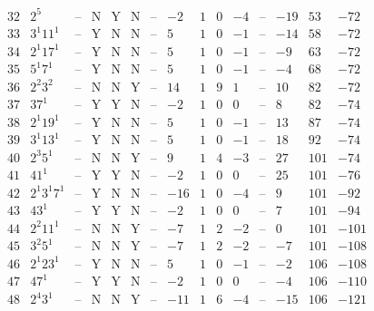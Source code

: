 \documentclass[11pt,reqno,a4letter]{article}
\numberwithin{figure}{section}
\numberwithin{table}{section}
\theoremstyle{plain}
\numberwithin{theorem}{section}
\theoremstyle{definition}
\begin{document}
\begin{table}[h!]
\begin{equation*}
{\begin{array}{|cc|c|ccc|c|c|ccc|c|ccc}
 32 & 2^5 & \text{--} & \text{N} & \text{Y} & \text{N} & \text{--} & -2 & 1 & 0 & -4 & \text{--} & -19 & 53 & -72 \\
 33 & 3^1 11^1 & \text{--} & \text{Y} & \text{N} & \text{N} & \text{--} & 5 & 1 & 0 & -1 & \text{--} & -14 & 58 & -72 \\
 34 & 2^1 17^1 & \text{--} & \text{Y} & \text{N} & \text{N} & \text{--} & 5 & 1 & 0 & -1 & \text{--} & -9 & 63 & -72 \\
 35 & 5^1 7^1 & \text{--} & \text{Y} & \text{N} & \text{N} & \text{--} & 5 & 1 & 0 & -1 & \text{--} & -4 & 68 & -72 \\
 36 & 2^2 3^2 & \text{--} & \text{N} & \text{N} & \text{Y} & \text{--} & 14 & 1 & 9 & 1 & \text{--} & 10 & 82 & -72 \\
 37 & 37^1 & \text{--} & \text{Y} & \text{Y} & \text{N} & \text{--} & -2 & 1 & 0 & 0 & \text{--} & 8 & 82 & -74 \\
 38 & 2^1 19^1 & \text{--} & \text{Y} & \text{N} & \text{N} & \text{--} & 5 & 1 & 0 & -1 & \text{--} & 13 & 87 & -74 \\
 39 & 3^1 13^1 & \text{--} & \text{Y} & \text{N} & \text{N} & \text{--} & 5 & 1 & 0 & -1 & \text{--} & 18 & 92 & -74 \\
 40 & 2^3 5^1 & \text{--} & \text{N} & \text{N} & \text{Y} & \text{--} & 9 & 1 & 4 & -3 & \text{--} & 27 & 101 & -74 \\
 41 & 41^1 & \text{--} & \text{Y} & \text{Y} & \text{N} & \text{--} & -2 & 1 & 0 & 0 & \text{--} & 25 & 101 & -76 \\
 42 & 2^1 3^1 7^1 & \text{--} & \text{Y} & \text{N} & \text{N} & \text{--} & -16 & 1 & 0 & -4 & \text{--} & 9 & 101 & -92 \\
 43 & 43^1 & \text{--} & \text{Y} & \text{Y} & \text{N} & \text{--} & -2 & 1 & 0 & 0 & \text{--} & 7 & 101 & -94 \\
 44 & 2^2 11^1 & \text{--} & \text{N} & \text{N} & \text{Y} & \text{--} & -7 & 1 & 2 & -2 & \text{--} & 0 & 101 & -101 \\
 45 & 3^2 5^1 & \text{--} & \text{N} & \text{N} & \text{Y} & \text{--} & -7 & 1 & 2 & -2 & \text{--} & -7 & 101 & -108 \\
 46 & 2^1 23^1 & \text{--} & \text{Y} & \text{N} & \text{N} & \text{--} & 5 & 1 & 0 & -1 & \text{--} & -2 & 106 & -108 \\
 47 & 47^1 & \text{--} & \text{Y} & \text{Y} & \text{N} & \text{--} & -2 & 1 & 0 & 0 & \text{--} & -4 & 106 & -110 \\
 48 & 2^4 3^1 & \text{--} & \text{N} & \text{N} & \text{Y} & \text{--} & -11 & 1 & 6 & -4 & \text{--} & -15 & 106 & -121 \\

\end{array}}
\end{equation*}
\end{table}
\end{document}
